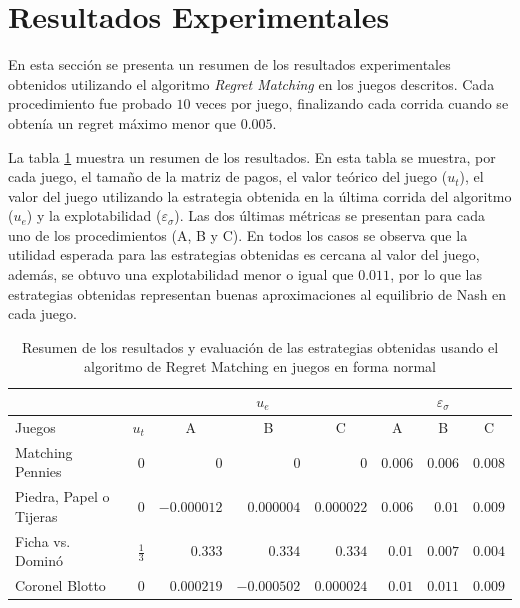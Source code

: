 \section{Resultados Experimentales}

En esta sección se presenta un resumen de los resultados experimentales obtenidos utilizando el algoritmo \textit{Regret Matching} en los juegos descritos. Cada procedimiento fue probado $10$ veces por juego, finalizando cada corrida cuando se obtenía un regret máximo menor que $0.005$.

La tabla \ref{tab:resumen-resultados-RM} muestra un resumen de los resultados. En esta tabla se muestra, por cada juego, el tamaño de la matriz de pagos, el valor teórico del juego ($u_t$), el valor del juego utilizando la estrategia obtenida en la última corrida del algoritmo ($u_e$) y la explotabilidad ($\varepsilon_{\sigma}$). Las dos últimas métricas se presentan para cada uno de los procedimientos (A, B y C). En todos los casos se observa que la utilidad esperada para las estrategias obtenidas es cercana al valor del juego, además, se obtuvo una explotabilidad menor o igual que $0.011$, por lo que las estrategias obtenidas representan buenas aproximaciones al equilibrio de Nash en cada juego.

\begin{table}[htpb]
    \centering
    \begin{tabular}{l|r|r r r|r r r}
        &  & \multicolumn{3}{|c}{$u_e$} & \multicolumn{3}{|c}{$\varepsilon_{\sigma}$}  \\ \hline
        Juegos & $u_t$ & \multicolumn{1}{|c}{A} & \multicolumn{1}{c}{B} & \multicolumn{1}{c|}{C}
          & \multicolumn{1}{|c}{A} & \multicolumn{1}{c}{B} & \multicolumn{1}{c}{C} \\ \hline
        Matching Pennies
            & $0$ & $0$ & $0$ & $0$ & $0.006$ & $0.006$ & $0.008$ \\
        Piedra, Papel o Tijeras
            & $0$ & $-0.000012$ & $0.000004$ & $0.000022$ & $0.006$ & $0.01$ & $0.009$ \\
        Ficha vs. Dominó
            & $\frac{1}{3}$ & $0.333$ & $0.334$ & $0.334$ & $0.01$ & $0.007$ & $0.004$ \\
        Coronel Blotto
            & $0$ & $0.000219$ & $-0.000502$ & $0.000024$ & $0.01$ & $0.011$ & $0.009$ \\
        \hline
    \end{tabular}
    \caption{Resumen de los resultados y evaluación de las estrategias obtenidas usando el algoritmo de Regret Matching en juegos en forma normal}
    \label{tab:resumen-resultados-RM}
\end{table}

